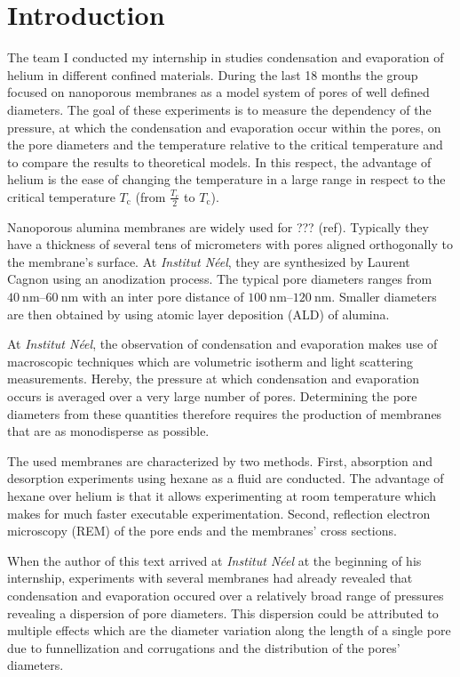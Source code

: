 \documentclass[../thesis.tex]{subfiles}
\begin{document}
  \chapter{Introduction}
  \label{ch:introduction}

    The team I conducted my internship in studies condensation and evaporation of helium in different confined materials. During the last 18 months the group focused on nanoporous membranes as a model system of pores of well defined diameters. The goal of these experiments is to measure the dependency of the pressure, at which the condensation and evaporation occur within the pores, on the pore diameters and the temperature relative to the critical temperature and to compare the results to theoretical models. In this respect, the advantage of helium is the ease of changing the temperature in a large range in respect to the critical temperature $T_\mathrm{c}$ (from $\frac{T_\mathrm{c}}{2}$ to $T_\mathrm{c}$).
    \medskip

    Nanoporous alumina membranes are widely used for ??? (ref). Typically they have a thickness of several tens of micrometers with pores aligned orthogonally to the membrane's surface. At \textit{Institut Néel}, they are synthesized by Laurent Cagnon using an anodization process. The typical pore diameters ranges from $\SIrange{40}{60}{\nano\meter}$ with an inter pore distance of $\SIrange{100}{120}{\nano\meter}$. Smaller diameters are then obtained by using atomic layer deposition (ALD) of alumina.
    \medskip

    At \textit{Institut Néel}, the observation of condensation and evaporation makes use of macroscopic techniques which are volumetric isotherm and light scattering measurements. Hereby, the pressure at which condensation and evaporation occurs is averaged over a very large number of pores. Determining the pore diameters from these quantities therefore requires the production of membranes that are as monodisperse as possible.
    \medskip

    The used membranes are characterized by two methods. First, absorption and desorption experiments using hexane as a fluid are conducted. The advantage of hexane over helium is that it allows experimenting at room temperature which makes for much faster executable experimentation. Second, reflection electron microscopy (REM) of the pore ends and the membranes' cross sections.
    \medskip

    When the author of this text arrived at \textit{Institut Néel} at the beginning of his internship, experiments with several membranes had already revealed that condensation and evaporation occured over a relatively broad range of pressures revealing a dispersion of pore diameters. This dispersion could be attributed to multiple effects which are the diameter variation along the length of a single pore due to funnellization and corrugations and the distribution of the pores' diameters.
    \medskip
\end{document}
